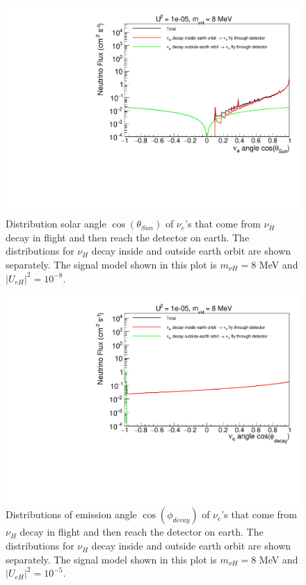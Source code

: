 \documentclass[%
 reprint,
 amsmath,amssymb,
 aps,
 prd,
floatfix,
twocolumn,
]{revtex4-1}
\begin{document}
\begin{figure}[!htbp]
\includegraphics[width=0.99\columnwidth]{../plots/DecayInFlightNuLCosthetaSun_U1e-05_M8.0_InsideOutside_linXlogY.pdf}
\caption{Distribution solar angle $\cos(\theta_{Sun})$ of $\nu_e$'s that come from $\nu_H$ decay in flight and then reach the detector on earth. The distributions for $\nu_H$ decay inside and outside earth orbit are shown separately. The signal model shown in this plot is $m_{\nu H} = 8$ MeV and $|U_{eH}|^2 = 10^{-8}$.}
\label{fig:DecayInFlightTheta_U1em5_M8} 
\end{figure}


\begin{figure}[!htbp]
\includegraphics[width=0.99\columnwidth]{../plots/DecayInFlightNuLCosphiSun_U1e-05_M8.0_InsideOutside_linXlogY.pdf}
\caption{Distributions of emission angle $\cos(\phi_{decay})$ of $\nu_e$'s that come from $\nu_H$ decay in flight and then reach the detector on earth. The distributions for $\nu_H$ decay inside and outside earth orbit are shown separately. The signal model shown in this plot is $m_{\nu H} = 8$ MeV and $|U_{eH}|^2 = 10^{-5}$.}
\label{fig:DecayInFlightPhi_U1em5_M8} 
\end{figure}
\end{document}
